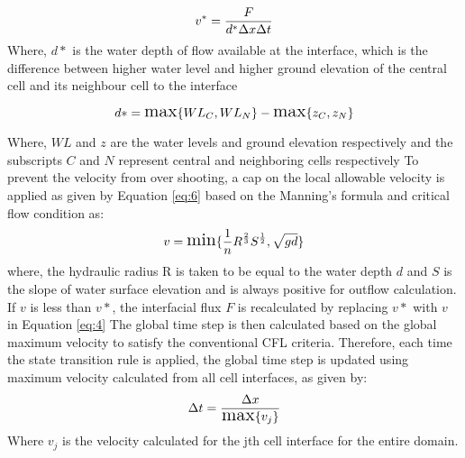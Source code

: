 \begin{equation} \label {eq:4}
	\Large v^{*} = \frac{F}{d^{*}\Delta{x}\Delta{t}}
\end{equation}
Where, $ d*$ is the water depth of flow available at the interface, which is the difference between higher water level and higher ground elevation of the central cell and its neighbour cell to the interface

\begin{equation} \label{eq:5}
	\Large d* = \text{max} \{WL_{C}, WL_{N}\} - \text{max}\{z_{C}, z_{N}\}
\end{equation}

Where, $WL$ and $z$ are the water levels and ground elevation respectively and the subscripts $C$ and $N$ represent central and neighboring cells respectively
To prevent the velocity from over shooting, a cap on the local allowable velocity is applied as given by Equation \ref{eq:6} based on the Manning's formula and critical flow condition as:
\begin{equation} \label{eq:6}
	\Large v = \text{min}\{\frac{1}{n}R^{\frac{2}{3}}S^{\frac{1}{2}}, \sqrt{gd}\}
\end{equation}
where, the hydraulic radius R is taken to be equal to the water depth $d$ and $S$ is the slope of water surface elevation and is always positive for outflow calculation. If $v$ is less than $v*$, the interfacial flux $F$ is recalculated by replacing $v*$ with $v$ in Equation \ref{eq:4}
The global time step is then calculated based on the global maximum velocity to satisfy the conventional CFL criteria. Therefore, each time the state transition rule is applied, the global time step is updated using maximum velocity calculated from all cell interfaces, as given by:
\begin{equation} \label{eq:7}
	\Large \Delta{t} = \frac{\Delta{x}}{\text{max}\{v_{j}\}}
\end{equation}
Where $v_{j}$ is the velocity calculated for the jth cell interface for the entire domain.

%
%
